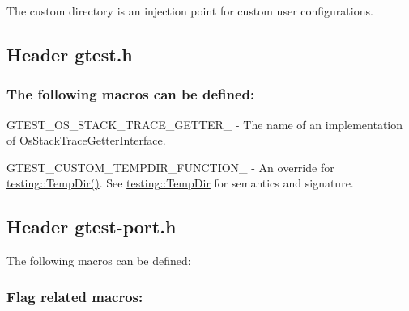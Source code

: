 The custom directory is an injection point for custom user configurations.

\subsection*{Header {\ttfamily gtest.\+h}}

\subsubsection*{The following macros can be defined\+:}


\begin{DoxyItemize}
\item {\ttfamily G\+T\+E\+S\+T\+\_\+\+O\+S\+\_\+\+S\+T\+A\+C\+K\+\_\+\+T\+R\+A\+C\+E\+\_\+\+G\+E\+T\+T\+E\+R\+\_\+} -\/ The name of an implementation of {\ttfamily Os\+Stack\+Trace\+Getter\+Interface}.
\item {\ttfamily G\+T\+E\+S\+T\+\_\+\+C\+U\+S\+T\+O\+M\+\_\+\+T\+E\+M\+P\+D\+I\+R\+\_\+\+F\+U\+N\+C\+T\+I\+O\+N\+\_\+} -\/ An override for {\ttfamily \mbox{\hyperlink{namespacetesting_aae1bbe7c3cc99bf56263d51d3982a52e}{testing\+::\+Temp\+Dir()}}}. See {\ttfamily \mbox{\hyperlink{namespacetesting_aae1bbe7c3cc99bf56263d51d3982a52e}{testing\+::\+Temp\+Dir}}} for semantics and signature.
\end{DoxyItemize}

\subsection*{Header {\ttfamily gtest-\/port.\+h}}

The following macros can be defined\+:

\subsubsection*{Flag related macros\+:}


